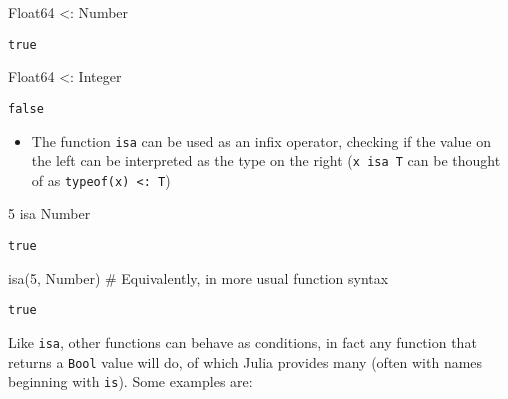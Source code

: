 \documentclass[
  letterpaper,
  DIV=11,
  numbers=noendperiod]{scrreprt}
\newenvironment{Shaded}{\begin{snugshade}}{\end{snugshade}}
\newcommand{\CommentTok}[1]{\textcolor[rgb]{0.37,0.37,0.37}{#1}}
\newcommand{\DataTypeTok}[1]{\textcolor[rgb]{0.68,0.00,0.00}{#1}}
\newcommand{\FloatTok}[1]{\textcolor[rgb]{0.68,0.00,0.00}{#1}}
\newcommand{\FunctionTok}[1]{\textcolor[rgb]{0.28,0.35,0.67}{#1}}
\newcommand{\NormalTok}[1]{\textcolor[rgb]{0.00,0.23,0.31}{#1}}
\newcommand{\OperatorTok}[1]{\textcolor[rgb]{0.37,0.37,0.37}{#1}}
\providecommand{\tightlist}{%
  \setlength{\itemsep}{0pt}\setlength{\parskip}{0pt}}\usepackage{longtable,booktabs,array}
\begin{document}
\begin{Shaded}
\begin{Highlighting}[]
\DataTypeTok{Float64} \OperatorTok{\textless{}:}\DataTypeTok{ Number}
\end{Highlighting}
\end{Shaded}

\begin{verbatim}
true
\end{verbatim}

\begin{Shaded}
\begin{Highlighting}[]
\DataTypeTok{Float64} \OperatorTok{\textless{}:}\DataTypeTok{ Integer}
\end{Highlighting}
\end{Shaded}

\begin{verbatim}
false
\end{verbatim}

\begin{itemize}
\tightlist
\item
  The function \texttt{isa} can be used as an infix operator, checking
  if the value on the left can be interpreted as the type on the right
  (\texttt{x\ isa\ T} can be thought of as
  \texttt{typeof(x)\ \textless{}:\ T})
\end{itemize}

\begin{Shaded}
\begin{Highlighting}[]
\FloatTok{5}\NormalTok{ isa }\DataTypeTok{Number}
\end{Highlighting}
\end{Shaded}

\begin{verbatim}
true
\end{verbatim}

\begin{Shaded}
\begin{Highlighting}[]
\FunctionTok{isa}\NormalTok{(}\FloatTok{5}\NormalTok{, }\DataTypeTok{Number}\NormalTok{) }\CommentTok{\# Equivalently, in more usual function syntax}
\end{Highlighting}
\end{Shaded}

\begin{verbatim}
true
\end{verbatim}

Like \texttt{isa}, other functions can behave as conditions, in fact any
function that returns a \texttt{Bool} value will do, of which Julia
provides many (often with names beginning with \texttt{is}). Some
examples are:
\end{document}
